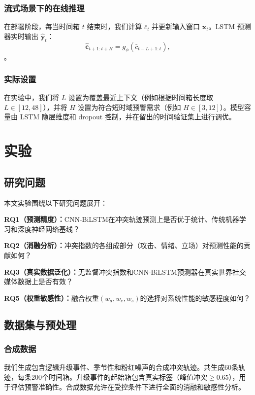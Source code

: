 \documentclass[conference]{IEEEtran}
\begin{document}
\subsubsection{流式场景下的在线推理}

在部署阶段，每当时间箱 $t$ 结束时，我们计算 $\bar{c}_t$ 并更新输入窗口 $\mathbf{x}_t$。LSTM 预测器实时输出 $\hat{\mathbf{y}}_t$：
\begin{equation}
\hat{\mathbf{c}}_{t+1:t+H} = g_\phi(\bar{c}_{t-L+1:t}),
\end{equation}
。

\subsubsection{实际设置}

在实验中，我们将 $L$ 设置为覆盖最近上下文（例如根据时间箱长度取 $L\in[12,48]$），并将 $H$ 设置为符合短时域预警需求（例如 $H\in[3,12]$）。模型容量由 LSTM 隐层维度和 dropout 控制，并在留出的时间验证集上进行调优。

\section{实验}

\subsection{研究问题}

本文实验围绕以下研究问题展开：

\noindent\textbf{RQ1（预测精度）：}CNN-BiLSTM在冲突轨迹预测上是否优于统计、传统机器学习和深度神经网络基线？

\noindent\textbf{RQ2（消融分析）：}冲突指数的各组成部分（攻击、情绪、立场）对预测性能的贡献如何？

\noindent\textbf{RQ3（真实数据泛化）：}无监督冲突指数和CNN-BiLSTM预测器在真实世界社交媒体数据上是否有效？


\noindent\textbf{RQ5（权重敏感性）：}融合权重$(w_a,w_e,w_s)$的选择对系统性能的敏感程度如何？

\subsection{数据集与预处理}

\subsubsection{合成数据}

我们生成包含逻辑升级事件、季节性和粉红噪声的合成冲突轨迹。共生成60条轨迹，每条200个时间箱。升级事件的起始箱包含真实标签（峰值冲突$\ge 0.65$），用于评估预警准确性。合成数据允许在受控条件下进行全面的消融和敏感性分析。
\end{document}
